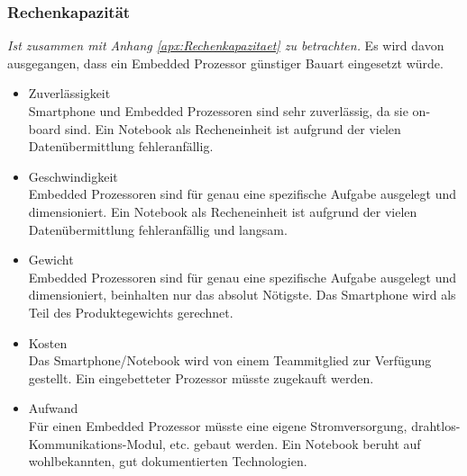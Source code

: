 		\subsubsection{Rechenkapazität}
			\textit{Ist zusammen mit Anhang \ref{apx:Rechenkapazitaet} zu betrachten.}
			Es wird davon ausgegangen, dass ein Embedded Prozessor günstiger Bauart eingesetzt würde.
			\begin{itemize}
				\item Zuverlässigkeit\\
				Smartphone und Embedded Prozessoren sind sehr zuverlässig, da sie on-board sind. Ein Notebook als Recheneinheit ist aufgrund der vielen Datenübermittlung fehleranfällig.
				\item Geschwindigkeit\\
				Embedded Prozessoren sind für genau eine spezifische Aufgabe ausgelegt und dimensioniert. Ein Notebook als Recheneinheit ist aufgrund der vielen Datenübermittlung fehleranfällig und langsam.
			 	\item Gewicht\\
			 	Embedded Prozessoren sind für genau eine spezifische Aufgabe ausgelegt und dimensioniert, beinhalten nur das absolut Nötigste. Das Smartphone wird als Teil des Produktegewichts gerechnet.
				\item Kosten\\
				Das Smartphone/Notebook wird von einem Teammitglied zur Verfügung gestellt. Ein eingebetteter Prozessor müsste zugekauft werden.
				\item Aufwand\\
				Für einen Embedded Prozessor müsste eine eigene Stromversorgung, drahtlos-Kommunikations-Modul, etc. gebaut werden. Ein Notebook beruht auf wohlbekannten, gut dokumentierten Technologien.
			\end{itemize}
			
